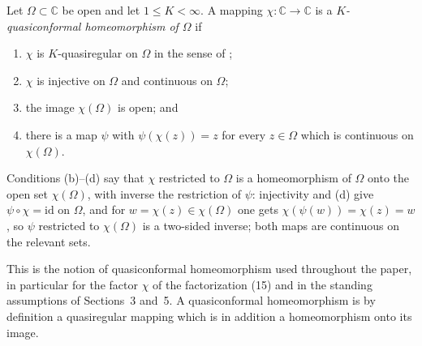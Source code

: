 \begin{definition}
Let $\Omega\subset\mathbb{C}$ be open and let $1\le K<\infty$.  A mapping
$\chi\colon\mathbb{C}\to\mathbb{C}$ is a \emph{$K$-quasiconformal
homeomorphism of $\Omega$} if
\begin{enumerate}
\item[(a)] $\chi$ is $K$-quasiregular on $\Omega$ in the sense of
;
\item[(b)] $\chi$ is injective on $\Omega$ and continuous on $\Omega$;
\item[(c)] the image $\chi(\Omega)$ is open; and
\item[(d)] there is a map $\psi$ with $\psi(\chi(z))=z$ for every $z\in\Omega$
which is continuous on $\chi(\Omega)$.
\end{enumerate}

Conditions (b)--(d) say that $\chi$ restricted to $\Omega$ is a homeomorphism
of $\Omega$ onto the open set $\chi(\Omega)$, with inverse the restriction of
$\psi$: injectivity and (d) give $\psi\circ\chi=\mathrm{id}$ on $\Omega$, and
for $w=\chi(z)\in\chi(\Omega)$ one gets $\chi(\psi(w))=\chi(z)=w$, so $\psi$
restricted to $\chi(\Omega)$ is a two-sided inverse; both maps are continuous
on the relevant sets.

This is the notion of quasiconformal homeomorphism used throughout the paper,
in particular for the factor $\chi$ of the factorization (15) and in the
standing assumptions of Sections~3 and~5.  A quasiconformal homeomorphism is
by definition a quasiregular mapping which is in addition a homeomorphism
onto its image.
\end{definition}
